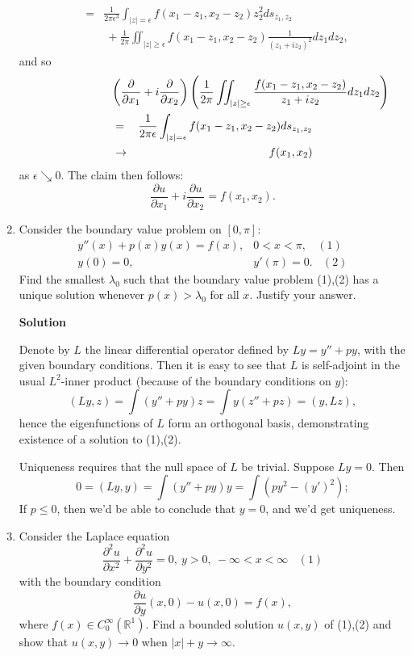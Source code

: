 \documentclass{article}
\begin{document}
\begin{enumerate}
\begin{eqnarray*}
& = & \frac{1}{2 \pi \epsilon^3} \int_{|z| = \epsilon} f(x_1 - z_1, x_2 - z_2) z_2^2 ds_{z_1,z_2} \\
&   & \ + \frac{1}{2 \pi} \iint_{|z| \geq \epsilon} f(x_1 - z_1, x_2 - z_2) \frac{1}{(z_1 + i z_2)^2} dz_1 dz_2,
\end{eqnarray*}
and so
\begin{eqnarray*}
\lefteqn{\left( \frac{\partial}{\partial x_1} + i \frac{\partial}{\partial x_2} \right) \left( \frac{1}{2 \pi} \iint_{|z| \geq \epsilon} \frac{f(x_1 - z_1, x_2 - z_2)}{z_1 + i z_2} dz_1 dz_2 \right)} \\
&  =  & \frac{1}{2 \pi \epsilon} \int_{|z| = \epsilon} f(x_1 - z_1, x_2 - z_2) ds_{z_1,z_2} \\
& \to & f(x_1,x_2)
\end{eqnarray*}
as \(\epsilon \searrow 0\).  The claim then follows:
\[\frac{\partial u}{\partial x_1} + i \frac{\partial u}{\partial x_2} = f(x_1,x_2).\]



\item Consider the boundary value problem on \([0,\pi]\):
\begin{eqnarray*}
y''(x) + p(x) y(x) = f(x), & 0 < x < \pi, \ \ \ \ (1) \\
y(0) = 0, & y'(\pi) = 0. \ \ \ \ (2)
\end{eqnarray*}
Find the smallest \(\lambda_0\) such that the boundary value problem (1),(2) has a unique solution whenever \(p(x) > \lambda_0\) for all \(x\).  Justify your answer.

{\bf Solution}

Denote by \(L\) the linear differential operator defined by \(Ly = y'' + p y\), with the given boundary conditions.  Then it is easy to see that \(L\) is self-adjoint in the usual \(L^2\)-inner product (because of the boundary conditions on \(y\)):
\[(Ly,z) = \int (y'' + p y) z = \int y (z'' + p z) = (y,Lz),\]
hence the eigenfunctions of \(L\) form an orthogonal basis, demonstrating existence of a solution to (1),(2).

Uniqueness requires that the null space of \(L\) be trivial.  Suppose \(Ly = 0\).  Then
\[0 = (Ly,y) = \int (y'' + p y) y = \int (p y^2 - (y')^2);\]
If \(p \leq 0\), then we'd be able to conclude that \(y = 0\), and we'd get uniqueness.



\item Consider the Laplace equation
\[\frac{\partial^2 u}{\partial x^2} + \frac{\partial^2 u}{\partial y^2} = 0, \ y > 0, \ -\infty < x < \infty \ \ \ \ (1)\]
with the boundary condition
\[\frac{\partial u}{\partial y}(x,0) - u(x,0) = f(x),\]
where \(f(x) \in C_0^{\infty}(\mathbb{R}^1)\).  Find a bounded solution \(u(x,y)\) of (1),(2) and show that \(u(x,y) \to 0\) when \(|x| + y \to \infty\).


\end{enumerate}
\end{document}
